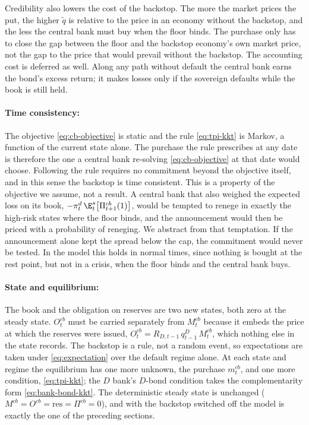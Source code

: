Credibility also lowers the cost of the backstop. The more the market prices the
put, the higher $\tilde q$ is relative to the price in an economy without the
backstop, and the less the central bank must buy when the floor binds. The
purchase only has to close the gap between the floor and the backstop economy's
own market price, not the gap to the price that would prevail without the
backstop. The accounting cost is deferred as well. Along any path without default
the central bank earns the bond's excess return; it makes losses only if the
sovereign defaults while the book is still held.

\paragraph{Time consistency:}
The objective \eqref{eq:cb-objective} is static and the rule \eqref{eq:tpi-kkt}
is Markov, a function of the current state alone. The purchase the rule
prescribes at any date is therefore the one a central bank re-solving
\eqref{eq:cb-objective} at that date would choose. Following the rule requires no
commitment beyond the objective itself, and in this sense the backstop is time
consistent. This is a property of the objective we assume, not a result. A
central bank that also weighed the expected loss on its book,
$-\pi^{d}_t\,\E^{s}_t\bigl[\Pi^{cb}_{t+1}(1)\bigr]$, would be tempted to renege in
exactly the high-risk states where the floor binds, and the announcement would
then be priced with a probability of reneging. We abstract from that temptation.
If the announcement alone kept the spread below the cap, the commitment would
never be tested. In the model this holds in normal times, since nothing is bought
at the rest point, but not in a crisis, when the floor binds and the central bank
buys.

\paragraph{State and equilibrium:}
The book and the obligation on reserves are two new states, both zero at the
steady state. $O^{cb}_t$ must be carried separately from $M^{cb}_t$ because it
embeds the price at which the reserves were issued,
$O^{cb}_t=R_{D,t-1}\,q^{D}_{t-1}\,M^{cb}_t$, which nothing else in the state
records. The backstop is a rule, not a random event, so expectations are taken
under \eqref{eq:expectation} over the default regime alone. At each state and
regime the equilibrium has one more unknown, the purchase $m^{cb}_t$, and one
more condition, \eqref{eq:tpi-kkt}; the $D$ bank's $D$-bond condition takes the
complementarity form \eqref{eq:bank-bond-kkt}. The deterministic steady state is
unchanged ($M^{cb}=O^{cb}=\mathrm{res}=\Pi^{cb}=0$), and with the backstop
switched off the model is exactly the one of the preceding sections.

